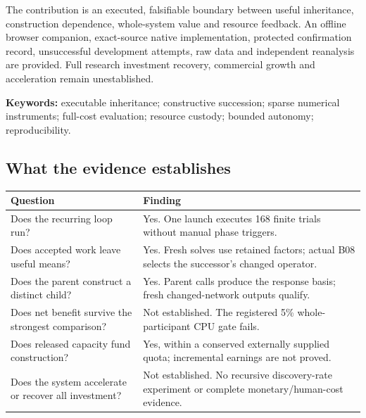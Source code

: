 The contribution is an executed, falsifiable boundary between useful inheritance, construction dependence,
whole-system value and resource feedback. An offline browser companion, exact-source native implementation,
protected confirmation record, unsuccessful development attempts, raw data and independent reanalysis are
provided. Full research investment recovery, commercial growth and acceleration remain unestablished.

\vspace{2mm}
{\small\textbf{Keywords:} executable inheritance; constructive succession; sparse numerical instruments;
full-cost evaluation; resource custody; bounded autonomy; reproducibility.}

\subsection*{What the evidence establishes}

\begin{tabularx}{\linewidth}{@{}L{44mm}Y@{}}\toprule
Question & Finding \\\midrule
Does the recurring loop run? & Yes. One launch executes 168 finite trials without manual phase triggers. \\
Does accepted work leave useful means? & Yes. Fresh solves use retained factors; actual B08 selects the successor's changed operator. \\
Does the parent construct a distinct child? & Yes. Parent calls produce the response basis; fresh changed-network outputs qualify. \\
Does net benefit survive the strongest comparison? & Not established. The registered 5\% whole-participant CPU gate fails. \\
Does released capacity fund construction? & Yes, within a conserved externally supplied quota; incremental earnings are not proved. \\
Does the system accelerate or recover all investment? & Not established. No recursive discovery-rate experiment or complete monetary/human-cost evidence. \\\bottomrule
\end{tabularx}
